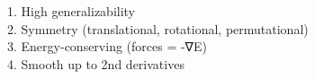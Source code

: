 \documentclass[preview]{standalone}
\begin{document}
1. High generalizability\\2. Symmetry (translational, rotational, permutational)\\3. Energy-conserving (forces = -∇E)\\4. Smooth up to 2nd derivatives\\
\end{document}
